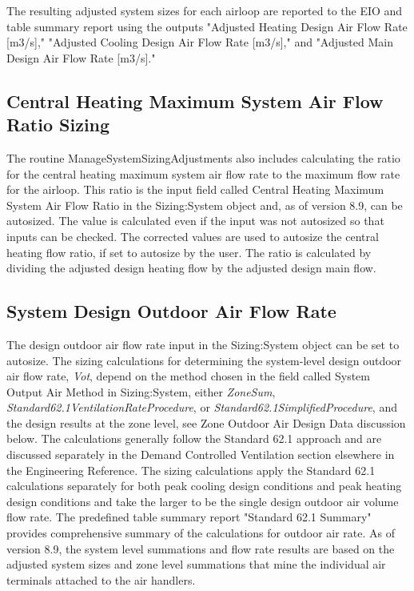  The resulting adjusted system sizes for each airloop are reported to the EIO and table summary report using the outputs "Adjusted Heating Design Air Flow Rate [m3/s]," "Adjusted Cooling Design Air Flow Rate [m3/s]," and "Adjusted Main Design Air Flow Rate [m3/s]."

\subsection{Central Heating Maximum System Air Flow Ratio Sizing}\label{central-heating-maximum-system-air-flow-ratio-sizing}

The routine ManageSystemSizingAdjustments also includes calculating the ratio for the central heating maximum system air flow rate to the maximum flow rate for the airloop.  This ratio is the input field called Central Heating Maximum System Air Flow Ratio in the Sizing:System object and, as of version 8.9, can be autosized.  The value is calculated even if the input was not autosized so that inputs can be checked.  The corrected values are used to autosize the central heating flow ratio, if set to autosize by the user. The ratio is calculated by dividing the adjusted design heating flow by the adjusted design main flow.

\subsection{System Design Outdoor Air Flow Rate}\label{Design-Outdoor-Air-Flow-Rate}

The design outdoor air flow rate input in the Sizing:System object can be set to autosize. The sizing calculations for determining the system-level design outdoor air flow rate, \emph{Vot}, depend on the method chosen in the field called System Output Air Method in Sizing:System, either \emph{ZoneSum}, \emph{Standard62.1VentilationRateProcedure}, or \emph{Standard62.1SimplifiedProcedure}, and the design results at the zone level, see Zone Outdoor Air Design Data discussion below. The calculations generally follow the Standard 62.1 approach and are discussed separately in the Demand Controlled Ventilation section elsewhere in the Engineering Reference. The sizing calculations apply the Standard 62.1 calculations separately for both peak cooling design conditions and peak heating design conditions and take the larger to be the single design outdoor air volume flow rate. The predefined table summary report "Standard 62.1 Summary" provides comprehensive summary of the calculations for outdoor air rate.  As of version 8.9, the system level summations and flow rate results are based on the adjusted system sizes and zone level summations that mine the individual air terminals attached to the air handlers.



